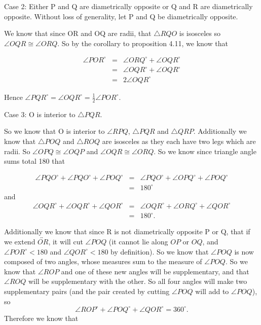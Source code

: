 \documentclass[12pt,letterpaper]{article}
\begin{document}
Case 2: Either P and Q are diametrically opposite or Q and R are diametrically opposite.  Without loss of generality, let P and Q be diametrically opposite.  

We know that since OR and OQ are radii, that $\triangle RQO$ is isosceles so $\angle OQR \cong \angle ORQ$.  So by the corollary to proposition 4.11, we know that

\begin{eqnarray*}
\angle POR^\circ &=& \angle ORQ^\circ + \angle OQR^\circ \\
&=&  \angle OQR^\circ+ \angle OQR^\circ \\
&=& 2 \angle OQR^\circ
\end{eqnarray*} 

Hence $\angle PQR^\circ = \angle OQR^\circ = \frac{1}{2} \angle POR^\circ$.





\newpage
Case 3: O is interior to $\triangle PQR$.

So we know that O is interior to $\angle RPQ$, $\triangle PQR$ and $\triangle QRP$.  Additionally we know that $\triangle POQ$ and $\triangle ROQ$ are isosceles as they each have two legs which are radii. So $\angle OPQ \cong \angle OQP$ and $\angle OQR \cong \angle ORQ$.  So we know since triangle angle sums total 180 that 

\begin{eqnarray*}
\angle PQO^\circ+\angle PQO^\circ+\angle POQ^\circ &=&\angle PQO^\circ+\angle OPQ^\circ+\angle POQ^\circ\\
&=&  180^\circ
\end{eqnarray*}
and 
\begin{eqnarray*}
\angle OQR^\circ+\angle OQR^\circ+\angle QOR^\circ &=& \angle OQR^\circ+\angle ORQ^\circ+\angle QOR^\circ\\
&=& 180^\circ.
\end{eqnarray*}  

Additionally we know that since R is not diametrically opposite P or Q, that if we extend $\overleftrightarrow{OR}$, it will cut $\angle POQ$ (it cannot lie along $OP$ or $OQ$, and $\angle POR^\circ < 180$ and $\angle QOR^\circ < 180$ by definition).  So we know that $\angle POQ$ is now composed of two angles, whose measures sum to the measure of $\angle POQ$.  So we know that $\angle ROP$ and one of these new angles will be supplementary, and that $\angle ROQ$ will be supplementary with the other. So all four angles will make two supplementary pairs (and the pair created by cutting $\angle POQ$ will add to $\angle POQ$), so $$\angle ROP^\circ + \angle POQ^\circ + \angle QOR^\circ = 360^\circ.$$  
Therefore we know that 
\end{document}
